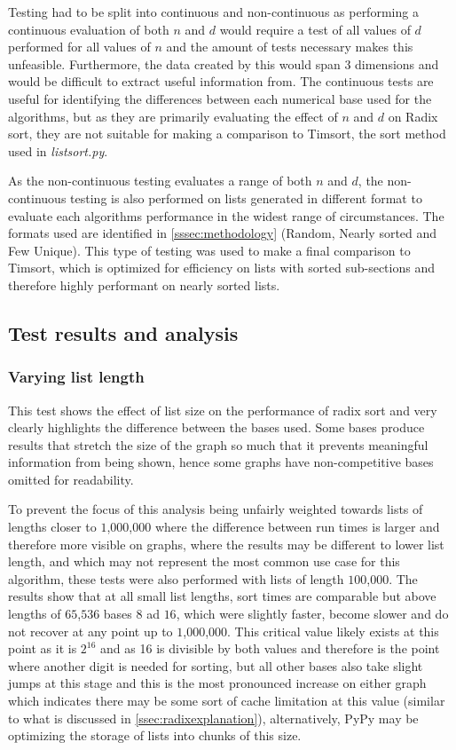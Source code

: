 \documentclass[12pt]{article}
\begin{document}
	\par
	Testing had to be split into continuous and non-continuous as performing a continuous evaluation of both $n$ and $d$ would require a test of all values of $d$ performed for all values of $n$ and the amount of tests necessary makes this unfeasible. Furthermore, the data created by this would span 3 dimensions and would be difficult to extract useful information from. The continuous tests are useful for identifying the differences between each numerical base used for the algorithms, but as they are primarily evaluating the effect of $n$ and $d$ on Radix sort, they are not suitable for making a comparison to Timsort, the sort method used in \textit{listsort.py}.
	\par
	As the non-continuous testing evaluates a range of both $n$ and $d$, the non-continuous testing is also performed on lists generated in different format to evaluate each algorithms performance in the widest range of circumstances. The formats used are identified in \ref{sssec:methodology} (Random, Nearly sorted and Few Unique). This type of testing was used to make a final comparison to Timsort, which is optimized for efficiency on lists with sorted sub-sections and therefore highly performant on nearly sorted lists.
	\par
	\pagebreak
	\subsection{Test results and analysis} 
	\subsubsection{Varying list length}
	This test shows the effect of list size on the performance of radix sort and very clearly highlights the difference between the bases used. Some bases produce results that stretch the size of the graph so much that it prevents meaningful information from being shown, hence some graphs have non-competitive bases omitted for readability.
	\par To prevent the focus of this analysis being unfairly weighted towards lists of lengths closer to $1$,$000$,$000$ where the difference between run times is larger and therefore more visible on graphs, where the results may be different to lower list length, and which may not represent the most common use case for this algorithm, these tests were also performed with lists of length $100$,$000$. 
	The results show that at all small list lengths, sort times are comparable but above lengths of $65$,$536$ bases $8$ ad $16$, which were slightly faster, become slower and do not recover at any point up to $1$,$000$,$000$. This critical value likely exists at this point as it is $2^{16}$ and as 16 is divisible by both values and therefore is the point where another digit is needed for sorting, but all other bases also take slight jumps at this stage and this is the most pronounced increase on either graph which indicates there may be some sort of cache limitation at this value (similar to what is discussed in \ref{ssec:radixexplanation}), alternatively, PyPy may be optimizing the storage of lists into chunks of this size.
\end{document}
